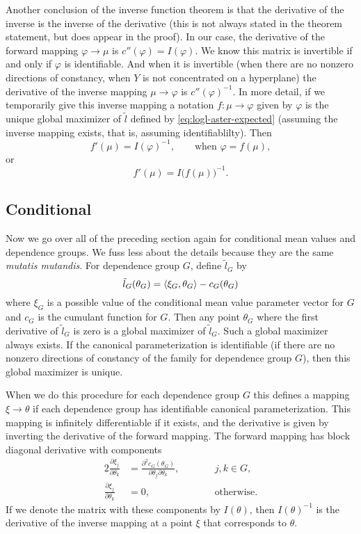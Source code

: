 Another conclusion of the inverse function theorem is that the derivative
of the inverse is the inverse of the derivative (this is not always
stated in the theorem statement, but does appear in the proof).
In our case, the derivative of the forward mapping $\varphi \to \mu$
is $c''(\varphi) = I(\varphi)$.  We know this matrix is invertible
if and only if $\varphi$ is identifiable.  And when it is invertible
(when there are no nonzero directions of constancy, when $Y$ is not
concentrated on a hyperplane) the derivative of the inverse mapping
$\mu \to \varphi$ is $c''(\varphi)^{- 1}$.
In more detail, if we temporarily give this inverse mapping a notation
$f : \mu \to \varphi$ given by $\varphi$ is the unique global maximizer
of $\tilde{l}$ defined by \eqref{eq:logl-aster-expected}
(assuming the inverse mapping exists, that is, assuming identifiablilty).
Then
$$
   f'(\mu) = I(\varphi)^{-1}, \qquad \text{when $\varphi = f(\mu)$},
$$
or
$$
   f'(\mu) = I\bigl(f(\mu)\bigr)^{-1}.
$$

\subsection{Conditional}

Now we go over all of the preceding section again
for conditional mean values and
dependence groups.  We fuss less about the details because they are the
same \emph{mutatis mutandis}.
For dependence group $G$, define $\tilde{l}_G$ by
\begin{equation} \label{eq:logl-aster-expected-g}
   \tilde{l}_G(\theta_G) = \langle \xi_G, \theta_G \rangle - c_G(\theta_G)
\end{equation}
where $\xi_G$ is a possible value of the conditional mean value parameter
vector for $G$ and $c_G$ is the cumulant function for $G$.
Then any point $\theta_G$
where the first derivative of $\tilde{l}_G$ is zero is a global maximizer
of $\tilde{l}_G$.  Such a global maximizer always exists.
If the canonical parameterization is identifiable (if there are
no nonzero directions of constancy of the family for dependence group $G$),
then this global maximizer is unique.

When we do this procedure for each dependence group $G$ this defines
a mapping $\xi \to \theta$ if each dependence group has identifiable
canonical parameterization.  This mapping is infinitely differentiable
if it exists, and the derivative is given by inverting the derivative
of the forward mapping.  The forward mapping has block diagonal derivative
with components
\begin{alignat*}{2}
   \frac{\partial \xi_j}{\partial \theta_k}
   & =
   \frac{\partial^2 c_G(\theta_G)}{\partial \theta_j \partial \theta_k},
   & \qquad & j, k \in G,
   \\
   \frac{\partial \xi_j}{\partial \theta_k}
   & =
   0, & & \text{otherwise}.
\end{alignat*}
If we denote the matrix with these components by $I(\theta)$, then
$I(\theta)^{-1}$ is the derivative of the inverse mapping at a point
$\xi$ that corresponds to $\theta$.

